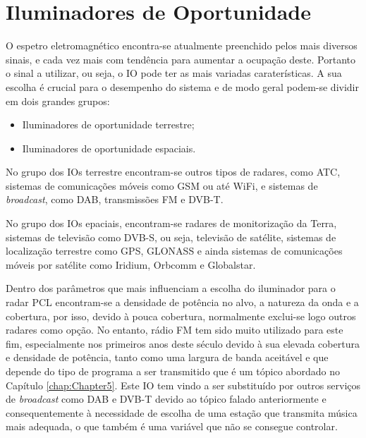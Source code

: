 \section{Iluminadores de Oportunidade} \label{IOS}
O espetro eletromagnético encontra-se atualmente preenchido pelos mais diversos sinais, e cada vez mais com tendência para aumentar a ocupação deste. Portanto o sinal a utilizar, ou seja, o \gls{IO} pode ter as mais variadas caraterísticas. A sua escolha é crucial para o desempenho do sistema e de modo geral podem-se dividir em dois grandes grupos:
\begin{itemize}
\item Iluminadores de oportunidade terrestre;
\item Iluminadores de oportunidade espaciais.
\end{itemize}\par
No grupo dos \gls{IO}s terrestre encontram-se outros tipos de radares, como \gls{ATC}, sistemas de comunicações móveis como \gls{GSM} ou até \gls{WiFi}, e sistemas de \textit{broadcast}, como \gls{DAB}, transmissões \gls{FM} e \gls{DVB-T}.\par 
No grupo dos \gls{IO}s epaciais, encontram-se radares de monitorização da Terra, sistemas de televisão como \gls{DVB-S}, ou seja, televisão de satélite, sistemas de localização terrestre como \gls{GPS}, GLONASS e ainda sistemas de comunicações móveis por satélite como Iridium, Orbcomm e Globalstar.\par
Dentro dos parâmetros que mais influenciam a escolha do iluminador para o radar \gls{PCL} encontram-se a densidade de potência no alvo, a natureza da onda e a cobertura, por isso, devido à pouca cobertura, normalmente exclui-se logo outros radares como opção. No entanto, rádio \gls{FM} tem sido muito utilizado para este fim, especialmente nos primeiros anos deste século devido à sua elevada cobertura e densidade de potência, tanto como uma largura de banda aceitável e que depende do tipo de programa a ser transmitido que é um tópico abordado no Capítulo \ref{chap:Chapter5}. Este \gls{IO} tem vindo a ser substituído por outros serviços de \textit{broadcast} como \gls{DAB} e \gls{DVB-T} devido ao tópico falado anteriormente e consequentemente à necessidade de escolha de uma estação que transmita música mais adequada, o que também é uma variável que não se consegue controlar.


